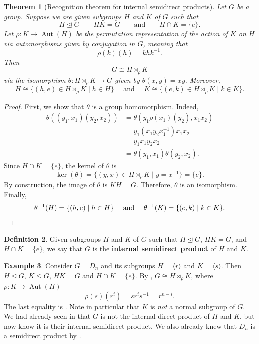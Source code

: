 \documentclass[12pt]{report}
\newtheorem{theorem}{Theorem}[chapter]
\numberwithin{equation}{section}
\numberwithin{theorem}{chapter}
\theoremstyle{definition}
\newtheorem{definition}[theorem]{Definition}
\newtheorem{example}[theorem]{Example}
\newtheorem*{basic properties}{Basic Properties}
\newtheorem*{Important Remark}{Important Remark}
\newcommand{\df}[1]{{\bf #1}\index{#1}}
\def\sdp{\rtimes}
\renewcommand{\ker}{\operatorname{ker}}
\DeclareMathOperator{\Aut}{Aut}
\def\norm{\mathrel{\unlhd}}
\begin{document}
\begin{theorem}[Recognition theorem for internal semidirect products]\label{semidirect product recognition}
Let $G$ be a group. Suppose we are given subgroups $H$ and $K$ of $G$ such that
$$H \norm G \qquad HK = G \qquad \text{and} \qquad H \cap K = \{e\}.$$
Let $\rho\!: K \to \Aut(H)$ be the permutation representation of the action of $K$ on $H$ via automorphisms given by conjugation in $G$, meaning that
$$\rho(k)(h) = khk^{-1}.$$
Then 
$$G \cong H \sdp_\rho K$$
via the isomorphism $\theta\!: H \sdp_\rho K \to G$ given by $\theta(x,y) = xy$. Moreover, 
$$H \cong \{(h,e) \in H \sdp_\rho K \mid h\in H\} \quad \text{ and } \quad K \cong \{(e,k) \in H \sdp_\rho K \mid k\in K\}.$$
\end{theorem}

\begin{proof}
First, we show that $\theta$ is a group homomorphism. Indeed,
$$\begin{aligned}
\theta((y_1, x_1) (y_2, x_2)) & = 
\theta(y_1 \rho(x_1)(y_2), x_1 x_2) \\
& = y_1(x_1y_2x_1^{-1}) x_1 x_2 \\
& = y_1x_1y_2x_2 \\
& = \theta(y_1, x_1) \theta(y_2, x_2).
\end{aligned}$$
Since $H \cap K = \{e\}$, the kernel of $\theta$ is 
$$\ker(\theta) = \{(y,x) \in H \sdp_{\rho} K \mid y = x^{-1} \} = \{ e \}.$$
By construction, the image of $\theta$ is $KH = G$. Therefore, $\theta$ is an isomorphism. Finally, 
$$\theta^{-1}(H) = \{(h,e)\mid h\in H\} \quad \text{ and } \quad \theta^{-1}(K) = \{(e,k)\mid k\in K\}.\qedhere$$
\end{proof}


\begin{definition} 
Given subgroups $H$ and $K$ of $G$ such that $H \norm G$, $HK = G$, and $H \cap K = \{e\}$, we say that $G$ is the \df{internal semidirect product} of $H$ and $K$.
\end{definition}

\begin{example}\label{D_n is a semidirect product part II}
Consider $G = D_{n}$ and its subgroups $H = \langle r \rangle$ and $K = \langle s \rangle$. Then $H \norm G$, $K \leq G$, $HK = G$ and $H \cap K = \{e\}$. By , $G \cong H \sdp_{\rho} K$, where $\rho\!: K \to \Aut(H)$
$$\rho(s)(r^i) = sr^is^{-1} = r^{n-i}.$$
The last equality is .
Note in particular that $K$ is \emph{not} a normal subgroup of $G$.
We had already seen in  that $G$ is not the internal direct product of $H$ and $K$, but now know it is their internal semidirect product. We also already knew that $D_n$ is a semidirect product by .
\end{example}
\end{document}
